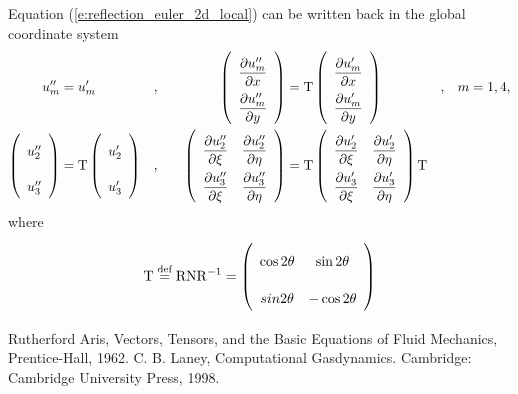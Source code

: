 \documentclass[a4paper,12pt,dvips]{article}
\newcommand*\defeq{\buildrel{\text{def}}\over{=}}
\begin{document}
Equation (\ref{e:reflection_euler_2d_local}) can be written back in the global
coordinate system
\begin{alignat}{4}
\renewcommand{\arraystretch}{2.2}
\begin{aligned}
  u''_m &= u'_m&,& \quad
  &\left(\begin{array}{c}
    \dfrac{\partial u''_m}{\partial x} \\
    \dfrac{\partial u''_m}{\partial y}
  \end{array}\right)
  &= \mathrm{T} \left(\begin{array}{c}
    \dfrac{\partial u'_m}{\partial x} \\
    \dfrac{\partial u'_m}{\partial y}
  \end{array}\right)&,& \quad m = 1, 4, \\
  \left(\begin{array}{c}
    u''_2 \\ u''_3
  \end{array}\right)
  &= \mathrm{T} \left(\begin{array}{c}
    u'_2 \\ u'_3
  \end{array}\right)&,& \quad
  &\left(\begin{array}{cc}
    \dfrac{\partial u''_2}{\partial\xi} &
    \dfrac{\partial u''_2}{\partial\eta} \\
    \dfrac{\partial u''_3}{\partial\xi} &
    \dfrac{\partial u''_3}{\partial\eta}
  \end{array}\right)
  &= \mathrm{T} \left(\begin{array}{cc}
    \dfrac{\partial u'_2}{\partial\xi} &
    \dfrac{\partial u'_2}{\partial\eta} \\
    \dfrac{\partial u'_3}{\partial\xi} &
    \dfrac{\partial u'_3}{\partial\eta}
  \end{array}\right) \mathrm{T}&&
\end{aligned} \label{e:reflection_euler_2d_global}
\end{alignat}
where
\begin{align}
  \mathrm{T} \defeq \mathrm{R}\mathrm{N}\mathrm{R}^{-1}
  = \left(\begin{array}{cc}
    \cos2\theta & \sin2\theta \\ sin2\theta & -\cos2\theta
  \end{array}\right) \label{e:reflection_T}
\end{align}

\begin{thebibliography}{99}
 Rutherford Aris, Vectors, Tensors, and the Basic
Equations of Fluid Mechanics, Prentice-Hall, 1962.
 C. B. Laney, Computational Gasdynamics.
Cambridge: Cambridge University Press, 1998.
\end{thebibliography}
\end{document}
